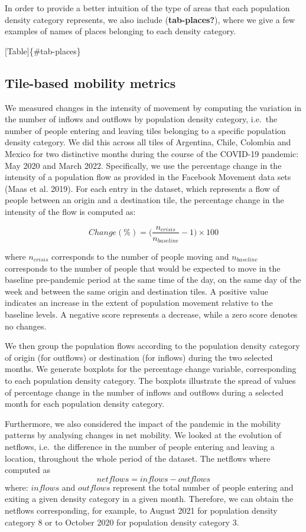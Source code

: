 \documentclass[
  10pt,
  letterpaper,
  DIV=11,
  numbers=noendperiod]{scrartcl}
\begin{document}
In order to provide a better intuition of the type of areas that each
population density category represents, we also include
(\textbf{tab-places?}), where we give a few examples of names of places
belonging to each density category.

{[}Table{]}\{\#tab-places\}

\hypertarget{tile-based-mobility-metrics}{%
\subsection{Tile-based mobility
metrics}\label{tile-based-mobility-metrics}}

We measured changes in the intensity of movement by computing the
variation in the number of inflows and outflows by population density
category, i.e.~the number of people entering and leaving tiles belonging
to a specific population density category. We did this across all tiles
of Argentina, Chile, Colombia and Mexico for two distinctive months
during the course of the COVID-19 pandemic: May 2020 and March 2022.
Specifically, we use the percentage change in the intensity of a
population flow as provided in the Facebook Movement data sets (Maas et
al. 2019). For each entry in the dataset, which represents a flow of
people between an origin and a destination tile, the percentage change
in the intensity of the flow is computed as:

\[
Change (\%) = \Biggl( \frac{n_{crisis}}{n_{baseline}}-1 \Biggl) \times 100
\]

where \(n_{crisis}\) corresponds to the number of people moving and
\(n_{baseline}\) corresponds to the number of people that would be
expected to move in the baseline pre-pandemic period at the same time of
the day, on the same day of the week and between the same origin and
destination tiles. A positive value indicates an increase in the extent
of population movement relative to the baseline levels. A negative score
represents a decrease, while a zero score denotes no changes.

We then group the population flows according to the population density
category of origin (for outflows) or destination (for inflows) during
the two selected months. We generate boxplots for the percentage change
variable, corresponding to each population density category. The
boxplots illustrate the spread of values of percentage change in the
number of inflows and outflows during a selected month for each
population density category.

Furthermore, we also considered the impact of the pandemic in the
mobility patterns by analysing changes in net mobility. We looked at the
evolution of netflows, i.e.~the difference in the number of people
entering and leaving a location, throughout the whole period of the
dataset. The netflows where computed as \[
netflows = inflows - outflows
\] where: \(inflows\) and \(outflows\) represent the total number of
people entering and exiting a given density category in a given month.
Therefore, we can obtain the netflows corresponding, for example, to
August 2021 for population density category 8 or to October 2020 for
population density category 3.
\end{document}
